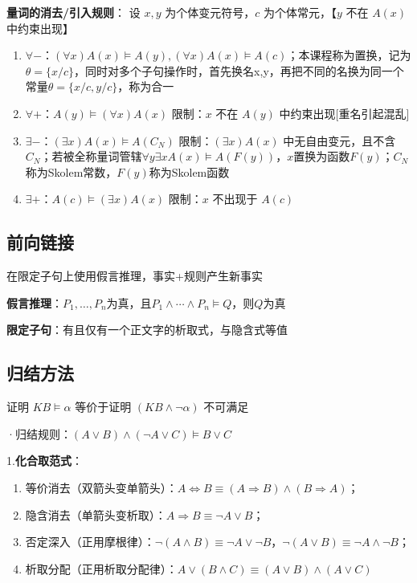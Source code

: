 	\textbf{量词的消去/引入规则}：
	设 $x, y$ 为个体变元符号，$c$ 为个体常元，【$y$ 不在 $A(x)$ 中约束出现】
	\begin{enumerate}
		\item \textbf{$\forall -$}：$(\forall x) A(x) \vDash A(y), (\forall x) A(x) \vDash A(c)$；本课程称为置换，记为$\theta=\{x/c\}$，同时对多个子句操作时，首先换名x,y，再把不同的名换为同一个常量$\theta=\{x/c,y/c\}$，称为合一
		\item \textbf{$\forall +$}：$A(y) \vDash (\forall x) A(x)$ 限制：$x$ 不在 $A(y)$ 中约束出现[重名引起混乱]
		\item \textbf{$\exists -$}：$(\exists x) A(x) \vDash A(C_N)$ 限制：$(\exists x) A(x)$ 中无自由变元，且不含 $C_N$；若被全称量词管辖$\forall y \exists x A(x) \vDash A(F(y))$，$x$置换为函数$F(y)$；$C_N$称为Skolem常数，$F(y)$称为Skolem函数
		\item \textbf{$\exists +$}：$A(c) \vDash (\exists x) A(x)$ 限制：$x$ 不出现于 $A(c)$
	\end{enumerate}
	
	\subsection*{前向链接}
	
	在限定子句上使用假言推理，事实+规则产生新事实
	
	\textbf{假言推理}：$P_{1},\ldots,P_{n}$为真，且$P_{1}\wedge\cdots\wedge P_{n}\vDash Q$，则$Q$为真
	
	\textbf{限定子句}：有且仅有一个正文字的析取式，与隐含式等值
	
	\subsection*{归结方法}
	
	证明 $KB \vDash \alpha$ 等价于证明 $(KB \wedge \neg \alpha)$ 不可满足
	
	·归结规则：$(A \vee B) \land (\lnot A \vee C) \vDash B \vee C$
	
	1.\textbf{化合取范式}：
	\begin{enumerate}
		\item 等价消去（双箭头变单箭头）：$A\Leftrightarrow B\equiv(A\Rightarrow B)\land(B\Rightarrow A)$；  
		\item 隐含消去（单箭头变析取）：$A\Rightarrow B\equiv\neg A\lor B$；  
		\item 否定深入（正用摩根律）：$\neg(A\land B)\equiv\neg A\lor\neg B$，$\neg(A\lor B)\equiv\neg A\land\neg B$；  
		\item 析取分配（正用析取分配律）：$A\lor(B\land C)\equiv(A\lor B)\land(A\lor C)$
	\end{enumerate}
	
